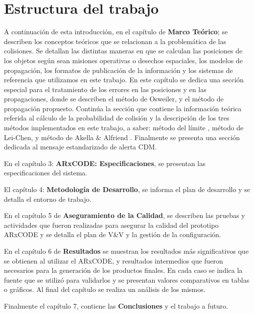 \section{Estructura del trabajo}

A continuaci\'on de esta introducci\'on, en el cap\'itulo de {\bf{Marco Te\'orico}}; se describen los conceptos te\'oricos que se relacionan a la problem\'atica de las colisiones. Se detallan las distintas maneras en que se calculan las posiciones de los objetos seg\'un sean misiones operativas o desechos espaciales, los modelos de propagaci\'on, los formatos de publicaci\'on de la informaci\'on y los sistemas de referencia que utilizamos en este trabajo. En este cap\'itulo se dedica una secci\'on especial para el tratamiento de los errores en las posiciones y en las propagaciones, donde se describen el m\'etodo de Osweiler, \citep{osweiler} y el m\'etodo de propagaci\'on propuesto. Contin\'ua la secci\'on que contiene la informaci\'on te\'orica referida al c\'alculo de la probabilidad de colisi\'on y la descripci\'on de los tres m\'etodos implementados en este trabajo, a saber: m\'etodo del l\'imite \citep{alfano2008method}, m\'etodo de Lei-Chen, \citep{leichen} y m\'etodo de Akella \& Alfriend \citep{akellaAlfriend}.  Finalmente se presenta una secci\'on dedicada al mensaje estandarizado de alerta \ac{CDM}.

En el cap\'itulo 3: {\bf{ARxCODE: Especificaciones}}, se presentan las especificaciones del sistema. 

El cap\'itulo 4: {\bf{Metodolog\'ia de Desarrollo}}, se informa el plan de desarrollo y se detalla el entorno de trabajo. 

En el cap\'itulo 5 de {\bf{Aseguramiento de la Calidad}}, se describen las pruebas y actividades que fueron realizadas para asegurar la calidad del prototipo ARxCODE y se detalla el plan de V\&V y la gesti\'on de la configuraci\'on. 

En el cap\'itulo 6 de {\bf{Resultados}} se muestran los resultados m\'as significativos que se obtienen al utilizar el ARxCODE, y resultados intermedios que fueron necesarios para la generaci\'on de los productos finales. En cada caso se indica la fuente que se utiliz\'o para validarlos y se presentan valores comparativos en tablas o gr\'aficos. Al final del cap\'itulo se realiza un an\'alisis de los mismos. 

Finalmente el cap\'itulo 7, contiene las {\bf{Conclusiones}} y el trabajo a futuro. 


\endinput